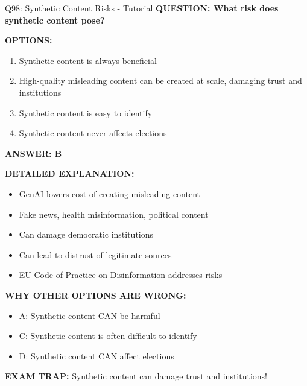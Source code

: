 \documentclass[8pt]{beamer}
\begin{document}
	\begin{frame}{Q98: Synthetic Content Risks - Tutorial}
		\fontsize{6.5}{7.5}\selectfont
		\textbf{QUESTION: What risk does synthetic content pose?}
		
		\vspace{0.1cm}
		\textbf{OPTIONS:}
		\begin{enumerate}
			\item Synthetic content is always beneficial
			\item High-quality misleading content can be created at scale, damaging trust and institutions
			\item Synthetic content is easy to identify
			\item Synthetic content never affects elections
		\end{enumerate}
		
		\vspace{0.1cm}
		\textcolor{myblue}{\textbf{ANSWER: B}}
		
		\vspace{0.1cm}
		\textbf{DETAILED EXPLANATION:}
		\begin{itemize}
			\item GenAI lowers cost of creating misleading content
			\item Fake news, health misinformation, political content
			\item Can damage democratic institutions
			\item Can lead to distrust of legitimate sources
			\item EU Code of Practice on Disinformation addresses risks
		\end{itemize}
		
		\vspace{0.1cm}
		\textcolor{myred}{\textbf{WHY OTHER OPTIONS ARE WRONG:}}
		\begin{itemize}
			\item \textcolor{myred}{A:} Synthetic content CAN be harmful
			\item \textcolor{myred}{C:} Synthetic content is often difficult to identify
			\item \textcolor{myred}{D:} Synthetic content CAN affect elections
		\end{itemize}
		
		\textcolor{myred}{\textbf{EXAM TRAP:}} Synthetic content can \textcolor{myblue}{damage trust and institutions}!
	\end{frame}
	
\end{document}

